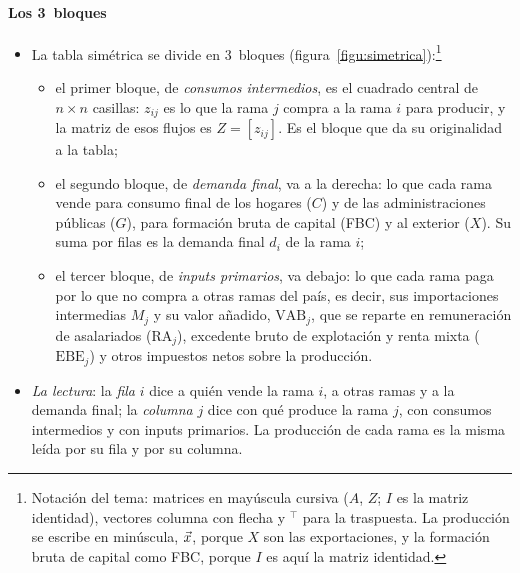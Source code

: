 \documentclass[11pt]{article}
\begin{document}
\paragraph{Los 3~bloques}

\begin{itemize}
\item La tabla simétrica se divide en 3~bloques (figura~\ref{figu:simetrica}):\footnote{Notación del tema: matrices en mayúscula cursiva ($A$, $Z$; $I$ es la matriz identidad), vectores columna con flecha y $^{\top}$ para la traspuesta. La producción se escribe en minúscula, $\vec{x}$, porque $X$ son las exportaciones, y la formación bruta de capital como FBC, porque $I$ es aquí la matriz identidad.}
  \begin{itemize}
  \item el primer bloque, de \emph{consumos intermedios}, es el cuadrado central de $n\times n$ casillas: $z_{ij}$ es lo que la rama $j$ compra a la rama $i$ para producir, y la matriz de esos flujos es $Z=[z_{ij}]$. Es el bloque que da su originalidad a la tabla;
  \item el segundo bloque, de \emph{demanda final}, va a la derecha: lo que cada rama vende para consumo final de los hogares ($C$) y de las administraciones públicas ($G$), para formación bruta de capital (FBC) y al exterior ($X$). Su suma por filas es la demanda final $d_i$ de la rama $i$;
  \item el tercer bloque, de \emph{inputs primarios}, va debajo: lo que cada rama paga por lo que no compra a otras ramas del país, es decir, sus importaciones intermedias $M_j$ y su valor añadido, $\mathrm{VAB}_j$, que se reparte en remuneración de asalariados ($\mathrm{RA}_j$), excedente bruto de explotación y renta mixta ($\mathrm{EBE}_j$) y otros impuestos netos sobre la producción.
  \end{itemize}
\item \emph{La lectura}: la \emph{fila} $i$ dice a quién vende la rama $i$, a otras ramas y a la demanda final; la \emph{columna} $j$ dice con qué produce la rama $j$, con consumos intermedios y con inputs primarios. La producción de cada rama es la misma leída por su fila y por su columna.
\end{itemize}

\begin{infografia}[H]
\centering
\caption{Los 3~bloques de la tabla \emph{input-output} simétrica}\label{figu:simetrica}
\end{infografia}
\end{document}
